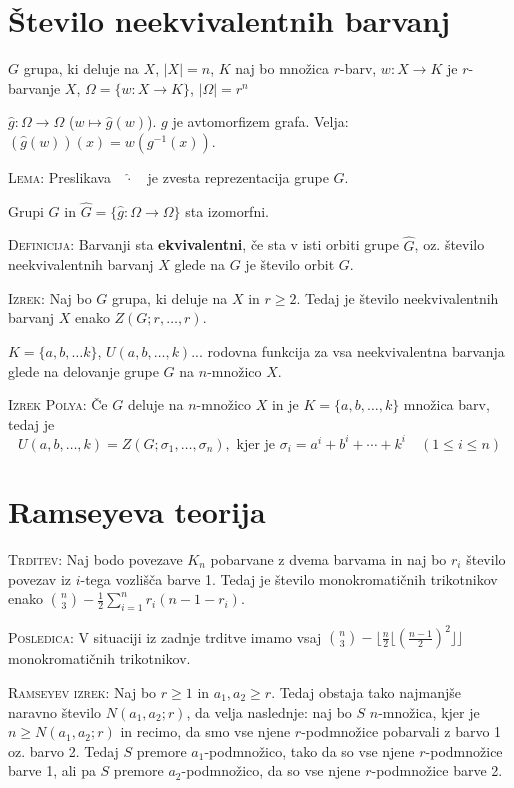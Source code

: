 \documentclass[8pt,a4paper]{amsart}
\theoremstyle{definition} %
\theoremstyle{plain} %
\begin{document}
\section{Število neekvivalentnih barvanj}

$G$ grupa, ki deluje na $X$, $|X|=n$, $K$ naj bo množica $r$-barv, $w: X
\longrightarrow K$ je $r$-barvanje $X$, $\Omega = \{ w: X \longrightarrow K \}$,
$|\Omega| = r^n$

$\widehat{g}: \Omega \longrightarrow \Omega$ ($w \mapsto \widehat{g}(w)$). $g$
je avtomorfizem grafa. Velja: $(\widehat{g}(w))(x) = w(g^{-1}(x))$.

\textsc{Lema:} Preslikava~~$\widehat{\cdot}$~~je zvesta reprezentacija grupe
$G$.

Grupi $G$ in $\widehat{G} = \{ \widehat{g}: \Omega \longrightarrow \Omega \}$
sta izomorfni.

\textsc{Definicija:} Barvanji sta \textbf{ekvivalentni}, če sta v isti orbiti
grupe $\widehat{G}$, oz. število neekvivalentnih barvanj $X$ glede na $G$ je
število orbit $G$.

\textsc{Izrek:} Naj bo $G$ grupa, ki deluje na $X$ in $r\geq 2$. Tedaj je
število neekvivalentnih barvanj $X$ enako $Z(G;r,\ldots ,r)$.

$K = \{ a,b,\ldots k\}$, $U(a,b,\ldots, k)$... rodovna funkcija za vsa
neekvivalentna barvanja glede na delovanje grupe $G$ na $n$-množico $X$.

\textsc{Izrek Polya:} Če $G$ deluje na $n$-množico $X$ in je $K = \{ a,b,\ldots
,k\}$ množica barv, tedaj je $$ U(a,b,\ldots, k) = Z(G;\sigma_1,\ldots
,\sigma_n),\text{ kjer je } \sigma_i = a^i + b^i + \cdots + k^i \quad (1\leq i
\leq n) $$

\section{Ramseyeva teorija}

\textsc{Trditev:} Naj bodo povezave $K_n$ pobarvane z dvema barvama in naj bo
$r_i$ število povezav iz $i$-tega vozlišča barve 1. Tedaj je število
monokromatičnih trikotnikov enako $\binom{n}{3} - \frac{1}{2}\sum_{i=1}^n
r_i(n-1-r_i)$.

\textsc{Posledica:} V situaciji iz zadnje trditve imamo vsaj $\binom{n}{3} -
\lfloor \frac{n}{2} \lfloor (\frac{n-1}{2})^2 \rfloor \rfloor $ monokromatičnih
trikotnikov.

\textsc{Ramseyev izrek:} Naj bo $r \geq 1$ in $a_1, a_2 \geq r$. Tedaj obstaja
tako najmanjše naravno število $N(a_1,a_2;r)$, da velja naslednje: naj bo $S$
$n$-množica, kjer je $n \geq N(a_1,a_2;r)$ in recimo, da smo vse njene
$r$-podmnožice pobarvali z barvo 1 oz. barvo 2. Tedaj $S$ premore
$a_1$-podmnožico, tako da so vse njene $r$-podmnožice barve 1, ali pa $S$
premore $a_2$-podmnožico, da so vse njene $r$-podmnožice barve 2.
\end{document}
